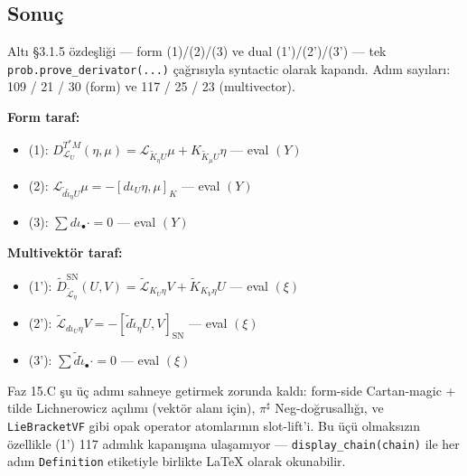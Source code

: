 \documentclass[11pt]{article}
\providecommand{\tightlist}{%
      \setlength{\itemsep}{0pt}\setlength{\parskip}{0pt}}
\begin{document}
    

    \subsection{Sonuç}\label{sonuuxe7}

Altı §3.1.5 özdeşliği --- form (1)/(2)/(3) ve dual (1')/(2')/(3') ---
tek \texttt{prob.prove\_derivator(...)} çağrısıyla syntactic olarak
kapandı. Adım sayıları: 109 / 21 / 30 (form) ve 117 / 25 / 23
(multivector).

\textbf{Form taraf:}

\begin{itemize}
\tightlist
\item
  (1):
  \(D^{T^{*}M}_{\mathcal{L}_U}(\eta, \mu) = \mathcal{L}_{\tilde{K}_\eta U}\mu + K_{\tilde{K}_\mu U}\eta\)
  --- eval \((Y)\)
\item
  (2):
  \(\mathcal{L}_{\tilde{d}\tilde{\iota}_\eta U}\mu = -[d\iota_U\eta, \mu]_K\)
  --- eval \((Y)\)
\item
  (3): \(\sum d\iota_\bullet \cdot = 0\) --- eval \((Y)\)
\end{itemize}

\textbf{Multivektör taraf:}

\begin{itemize}
\tightlist
\item
  (1'):
  \(\tilde{D}^{\mathrm{SN}}_{\tilde{\mathcal{L}}_\eta}(U, V) = \tilde{\mathcal{L}}_{K_U\eta}V + \tilde{K}_{K_V\eta}U\)
  --- eval \((\xi)\)
\item
  (2'):
  \(\tilde{\mathcal{L}}_{d\iota_U\eta}V = -[\tilde{d}\tilde{\iota}_\eta U, V]_{\mathrm{SN}}\)
  --- eval \((\xi)\)
\item
  (3'): \(\sum \tilde{d}\tilde{\iota}_\bullet \cdot = 0\) --- eval
  \((\xi)\)
\end{itemize}

Faz 15.C şu üç adımı sahneye getirmek zorunda kaldı: form-side
Cartan-magic + tilde Lichnerowicz açılımı (vektör alanı için),
\(\pi^\sharp\) Neg-doğrusallığı, ve \texttt{LieBracketVF} gibi opak
operator atomlarının slot-lift'i. Bu üçü olmaksızın özellikle (1') 117
adımlık kapanışına ulaşamıyor --- \texttt{display\_chain(chain)} ile her
adım \texttt{Definition} etiketiyle birlikte LaTeX olarak okunabilir.


    
    
    
\end{document}
